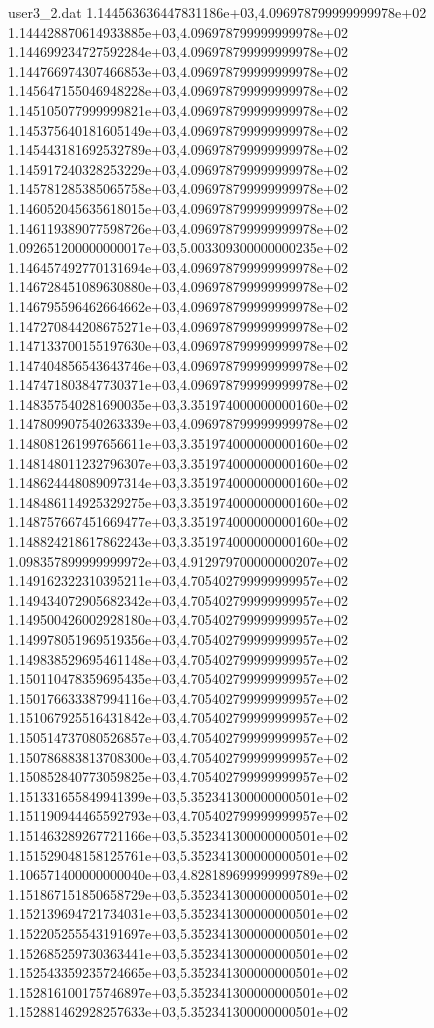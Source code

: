 \begin{filecontents}{user3_2.dat}
1.144563636447831186e+03,4.096978799999999978e+02
1.144428870614933885e+03,4.096978799999999978e+02
1.144699234727592284e+03,4.096978799999999978e+02
1.144766974307466853e+03,4.096978799999999978e+02
1.145647155046948228e+03,4.096978799999999978e+02
1.145105077999999821e+03,4.096978799999999978e+02
1.145375640181605149e+03,4.096978799999999978e+02
1.145443181692532789e+03,4.096978799999999978e+02
1.145917240328253229e+03,4.096978799999999978e+02
1.145781285385065758e+03,4.096978799999999978e+02
1.146052045635618015e+03,4.096978799999999978e+02
1.146119389077598726e+03,4.096978799999999978e+02
1.092651200000000017e+03,5.003309300000000235e+02
1.146457492770131694e+03,4.096978799999999978e+02
1.146728451089630880e+03,4.096978799999999978e+02
1.146795596462664662e+03,4.096978799999999978e+02
1.147270844208675271e+03,4.096978799999999978e+02
1.147133700155197630e+03,4.096978799999999978e+02
1.147404856543643746e+03,4.096978799999999978e+02
1.147471803847730371e+03,4.096978799999999978e+02
1.148357540281690035e+03,3.351974000000000160e+02
1.147809907540263339e+03,4.096978799999999978e+02
1.148081261997656611e+03,3.351974000000000160e+02
1.148148011232796307e+03,3.351974000000000160e+02
1.148624448089097314e+03,3.351974000000000160e+02
1.148486114925329275e+03,3.351974000000000160e+02
1.148757667451669477e+03,3.351974000000000160e+02
1.148824218617862243e+03,3.351974000000000160e+02
1.098357899999999972e+03,4.912979700000000207e+02
1.149162322310395211e+03,4.705402799999999957e+02
1.149434072905682342e+03,4.705402799999999957e+02
1.149500426002928180e+03,4.705402799999999957e+02
1.149978051969519356e+03,4.705402799999999957e+02
1.149838529695461148e+03,4.705402799999999957e+02
1.150110478359695435e+03,4.705402799999999957e+02
1.150176633387994116e+03,4.705402799999999957e+02
1.151067925516431842e+03,4.705402799999999957e+02
1.150514737080526857e+03,4.705402799999999957e+02
1.150786883813708300e+03,4.705402799999999957e+02
1.150852840773059825e+03,4.705402799999999957e+02
1.151331655849941399e+03,5.352341300000000501e+02
1.151190944465592793e+03,4.705402799999999957e+02
1.151463289267721166e+03,5.352341300000000501e+02
1.151529048158125761e+03,5.352341300000000501e+02
1.106571400000000040e+03,4.828189699999999789e+02
1.151867151850658729e+03,5.352341300000000501e+02
1.152139694721734031e+03,5.352341300000000501e+02
1.152205255543191697e+03,5.352341300000000501e+02
1.152685259730363441e+03,5.352341300000000501e+02
1.152543359235724665e+03,5.352341300000000501e+02
1.152816100175746897e+03,5.352341300000000501e+02
1.152881462928257633e+03,5.352341300000000501e+02

\end{filecontents}
